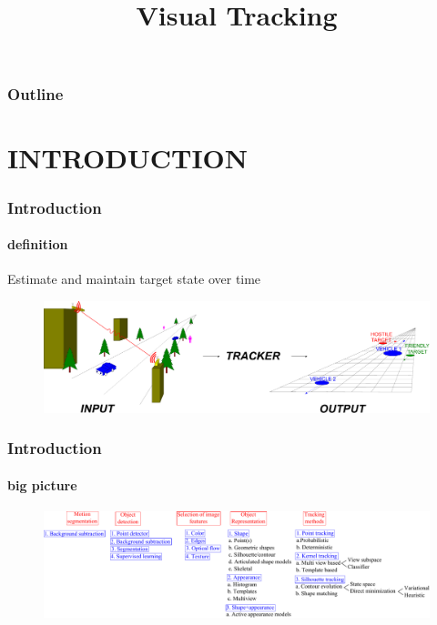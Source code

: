 
\title{Visual Tracking}
\begin{frame}[plain]\logoTechTower
	\titlepage
\end{frame}

\begin{frame}
\frametitle{Outline}
\logoCSIPCPL\logoTechTower
	\setcounter{tocdepth}{1}	
	\tableofcontents
\end{frame}

\section{INTRODUCTION}
\begin{frame}
\frametitle{Introduction}
\framesubtitle{definition}
\logoCSIPCPL\mypagenum
	Estimate and maintain {\color{red}target state} over {\color{red}time}
	\begin{figure}
		\includegraphics[width=1.0\textwidth]{figs/TRK_overviewDiagram.pdf}
	\end{figure}
\end{frame}

\begin{frame}[plain]
\frametitle{Introduction}
\framesubtitle{big picture}
\logoCSIPCPL\mypagenum
{}
	\begin{changemargin}{-1.35in}{0in}
		\begin{figure}
			\includegraphics[width=1.35\textwidth]{figs/TRK_overview.pdf}
		\end{figure}	
	\end{changemargin}
\end{frame}



